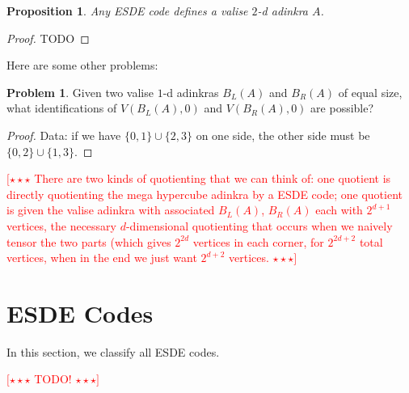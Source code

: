 \documentclass[12pt,twoside,singlespace]{article}
\numberwithin{equation}{section}
\newtheorem{prop}[equation]{Proposition}
\theoremstyle{definition}
\newtheorem{prob}{Problem}
\newcommand{\com}[1]{\textcolor{red}{$[\star \star \star$ #1 $\star \star \star]$}}
\begin{document}
\begin{prop}
Any ESDE code defines a valise $2$-d adinkra $A$.
\end{prop}
\begin{proof}
TODO
\end{proof}

Here are some other problems:
\begin{prob}
Given two valise $1$-d adinkras $B_L(A)$ and $B_R(A)$ of equal size, what identifications of $V(B_L(A), 0)$ and $V(B_R(A), 0)$ are possible?
\end{prob}
\begin{proof}
Data: if we have $\{0,1\} \cup \{2,3\}$ on one side, the other side must be $\{0,2\} \cup \{1, 3\}$.
\end{proof}

\com{There are two kinds of quotienting that we can think of: one quotient is directly quotienting the mega hypercube adinkra by a ESDE code; one quotient is given the valise adinkra with associated $B_L(A)$, $B_R(A)$ each with $2^{d+1}$ vertices, the necessary $d$-dimensional quotienting that occurs when we naively tensor the two parts (which gives $2^{2d}$ vertices in each corner, for $2^{2d+2}$ total vertices, when in the end we just want $2^{d+2}$ vertices.}

\section{ESDE Codes}

In this section, we classify all ESDE codes.

\com{TODO!}
\end{document}
